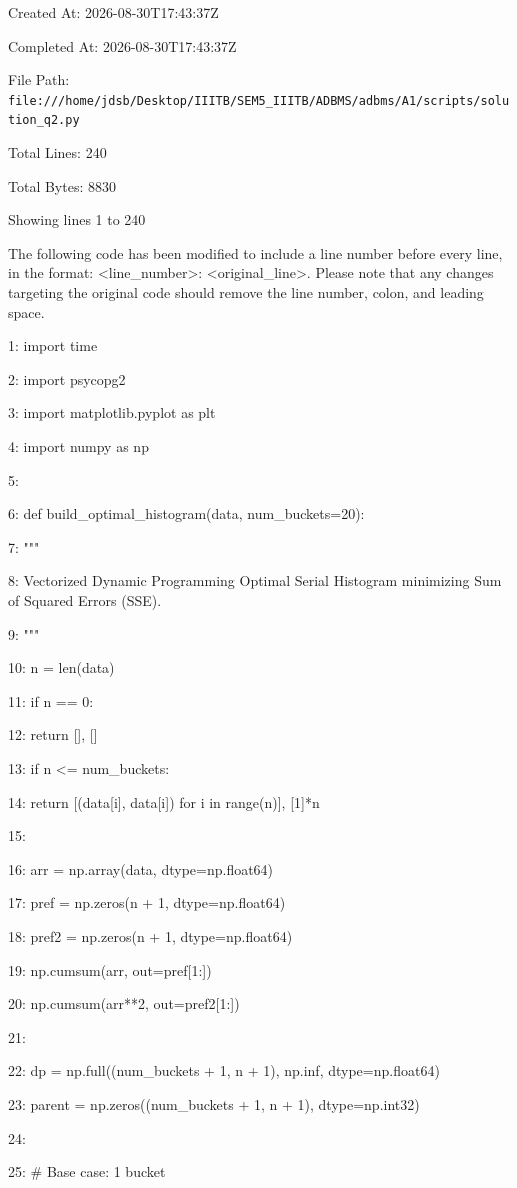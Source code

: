 \documentclass[11pt,a4paper]{article}
\begin{document}
{Created At: 2026-08-30T17:43:37Z

Completed At: 2026-08-30T17:43:37Z

File Path: \texttt{file:///home/jdsb/Desktop/IIITB/SEM5\_IIITB/ADBMS/adbms/A1/scripts/solution\_q2.py}

Total Lines: 240

Total Bytes: 8830

Showing lines 1 to 240

The following code has been modified to include a line number before every line, in the format: <line\_number>: <original\_line>. Please note that any changes targeting the original code should remove the line number, colon, and leading space.

1: import time

2: import psycopg2

3: import matplotlib.pyplot as plt

4: import numpy as np

5:

6: def build\_optimal\_histogram(data, num\_buckets=20):

7:     """

8:     Vectorized Dynamic Programming Optimal Serial Histogram minimizing Sum of Squared Errors (SSE).

9:     """

10:     n = len(data)

11:     if n == 0:

12:         return [], []

13:     if n <= num\_buckets:

14:         return [(data[i], data[i]) for i in range(n)], [1]*n

15:

16:     arr = np.array(data, dtype=np.float64)

17:     pref = np.zeros(n + 1, dtype=np.float64)

18:     pref2 = np.zeros(n + 1, dtype=np.float64)

19:     np.cumsum(arr, out=pref[1:])

20:     np.cumsum(arr**2, out=pref2[1:])

21:

22:     dp = np.full((num\_buckets + 1, n + 1), np.inf, dtype=np.float64)

23:     parent = np.zeros((num\_buckets + 1, n + 1), dtype=np.int32)

24:

25:     \# Base case: 1 bucket

}
\end{document}
